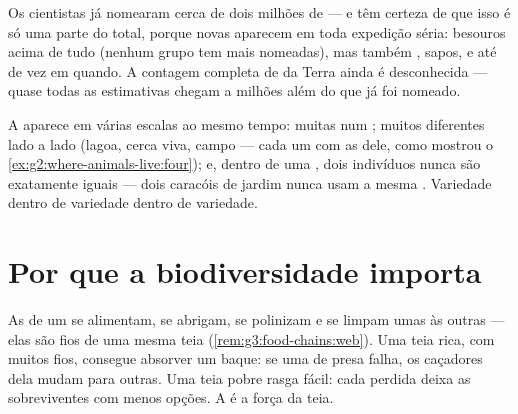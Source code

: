 \begin{example}\label{ex:g5:biodiversity:planet}
Os cientistas já nomearam cerca de dois milhões de  --- e
têm certeza de que isso é só uma parte do total, porque 
novas aparecem em toda expedição séria: besouros acima de tudo
(nenhum grupo tem mais  nomeadas), mas também , sapos,
 e até  de vez em quando. A contagem completa de
 da Terra ainda é desconhecida --- quase todas as
estimativas chegam a milhões além do que já foi nomeado.
\end{example}

\begin{remark}\label{rem:g5:biodiversity:scales}
A  aparece em várias escalas ao mesmo tempo: muitas
 num ; muitos  diferentes lado a lado (lagoa,
cerca viva, campo --- cada um com as  dele, como mostrou o
\cref{ex:g2:where-animals-live:four}); e, dentro de uma , dois
indivíduos nunca são exatamente iguais --- dois caracóis de jardim
nunca usam a mesma . Variedade dentro de variedade dentro de
variedade.
\end{remark}

\section{Por que a biodiversidade importa}

\begin{proposition}\label{prop:g5:biodiversity:web}
As  de um  se alimentam, se abrigam, se polinizam e
se limpam umas às outras --- elas são fios de uma mesma teia
(\cref{rem:g3:food-chains:web}). Uma teia rica, com muitos fios,
consegue absorver um baque: se uma  de presa falha, os
caçadores dela mudam para outras. Uma teia pobre rasga fácil: cada
 perdida deixa as sobreviventes com menos opções. A
 é a força da teia.
\end{proposition}
\admitted

